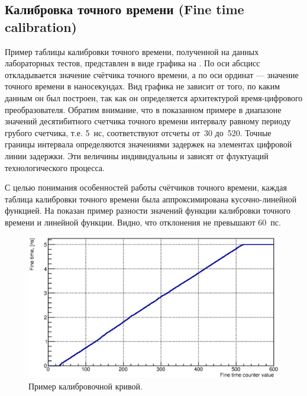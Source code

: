 \subsection{Калибровка точного времени (Fine time calibration)}\label{section:FTcalib}

Пример таблицы калибровки точного времени, полученной на данных лабораторных тестов, представлен в виде графика на . По оси абсцисс откладывается значение счётчика точного времени, а по оси ординат --- значение точного времени в наносекундах. Вид графика не зависит от того, по каким данным он был построен, так как он определяется архитектурой время-цифрового преобразователя. Обратим внимание, что в показанном примере в диапазоне значений десятибитного счетчика точного времени интервалу равному периоду грубого счетчика, т.е. 5~нс, соответствуют отсчеты от~30 до~520. Точные границы интервала определяются значениями задержек на элементах цифровой линии задержки. Эти величины индивидуальны и зависят от флуктуаций технологического процесса.

С целью понимания особенностей работы счётчиков точного времени, каждая таблица калибровки точного времени была аппроксимирована кусочно-линейной функцией. На  показан пример разности значений функции калибровки точного времени и линейной функции. Видно, что отклонения не превышают 60~пс.

\begin{figure}
\includegraphics[width=1.0\textwidth]{pictures/17_CalTable_0010_01.eps}
\caption{Пример калибровочной кривой.}
\label{fig:TypicalCalibTable}
\end{figure}

